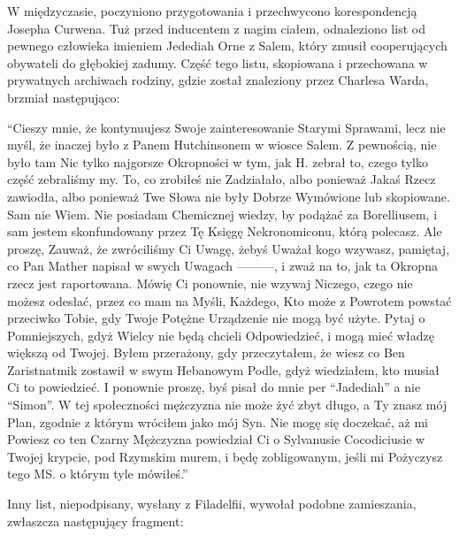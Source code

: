 W międzyczasie, poczyniono przygotowania i przechwycono korespondencją Josepha Curwena. Tuż przed inducentem z nagim ciałem, odnaleziono list od pewnego człowieka imieniem Jedediah Orne z Salem, który zmusił cooperujących obywateli do głębokiej zadumy. Część tego listu, skopiowana i przechowana w prywatnych archiwach rodziny, gdzie został znaleziony przez Charlesa Warda, brzmiał następująco: 

\begin{displayquote}

``Cieszy mnie, że kontynuujesz Swoje zainteresowanie Starymi Sprawami, lecz nie myśl, że inaczej było z Panem Hutchinsonem w wiosce Salem. Z pewnością, nie było tam Nic tylko najgorsze Okropności w tym, jak H. zebrał to, czego tylko część zebraliśmy my. To, co zrobiłeś nie Zadziałało, albo ponieważ Jakaś Rzecz zawiodła, albo ponieważ Twe Słowa nie były Dobrze Wymówione lub skopiowane. Sam nie Wiem. Nie posiadam Chemicznej wiedzy, by podążać za Borelliusem, i sam jestem skonfundowany przez Tę Księgę Nekronomiconu, którą polecasz. Ale proszę, Zauważ, że zwróciliśmy Ci Uwagę, żebyś Uważał kogo wzywasz, pamiętaj, co Pan Mather napisał w swych Uwagach ———, i zważ na to, jak ta Okropna rzecz jest raportowana. Mówię Ci ponownie, nie wzywaj Niczego, czego nie możesz odesłać, przez co mam na Myśli, Każdego, Kto może z Powrotem powstać przeciwko Tobie, gdy Twoje Potężne Urządzenie nie mogą być użyte. Pytaj o Pomniejszych, gdyż Wielcy nie będą chcieli Odpowiedzieć, i mogą mieć władzę większą od Twojej. Byłem przerażony, gdy przeczytałem, że wiesz co Ben Zaristnatmik zostawił w swym Hebanowym Podle, gdyż wiedziałem, kto musiał Ci to powiedzieć. I ponownie proszę, byś pisał do mnie per ``Jadediah'' a nie ``Simon''. W tej społeczności mężczyzna nie może żyć zbyt długo, a Ty znasz mój Plan, zgodnie z którym wróciłem jako mój Syn. Nie mogę się doczekać, aż mi Powiesz co ten Czarny Mężczyzna powiedział Ci o Sylvanusie Cocodiciusie w Twojej krypcie, pod Rzymskim murem, i będę zobligowanym, jeśli mi Pożyczysz tego MS. o którym tyle mówiłeś.''

\end{displayquote}

Inny list, niepodpisany, wysłany z Filadelfii, wywołał podobne zamieszania, zwłaszcza następujący fragment:

